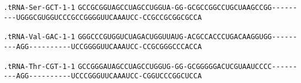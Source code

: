 \documentclass{article}
\newcommand{\rnabox}[1]{\colorbox{#1}{\texttt{#1}}}
\begin{document}
\texttt{.tRNA-Ser-GCT-1-1}
\rnabox{G}\rnabox{C}\rnabox{C}\rnabox{G}\rnabox{C}\rnabox{G}\rnabox{G}\rnabox{U}\rnabox{A}\rnabox{G}\rnabox{C}\rnabox{C}\rnabox{U}\rnabox{A}\rnabox{G}\rnabox{C}\rnabox{C}\rnabox{U}\rnabox{G}\rnabox{G}\rnabox{U}\rnabox{A}\rnabox{-}\rnabox{G}\rnabox{G}\rnabox{-}\rnabox{G}\rnabox{C}\rnabox{G}\rnabox{C}\rnabox{C}\rnabox{G}\rnabox{G}\rnabox{C}\rnabox{C}\rnabox{U}\rnabox{G}\rnabox{C}\rnabox{U}\rnabox{A}\rnabox{A}\rnabox{G}\rnabox{C}\rnabox{C}\rnabox{G}\rnabox{G}\rnabox{-}\rnabox{-}\rnabox{-}\rnabox{-}\rnabox{-}\rnabox{-}\rnabox{-}\rnabox{-}\rnabox{-}\rnabox{U}\rnabox{G}\rnabox{G}\rnabox{G}\rnabox{C}\rnabox{G}\rnabox{U}\rnabox{G}\rnabox{G}\rnabox{U}\rnabox{C}\rnabox{C}\rnabox{C}\rnabox{G}\rnabox{C}\rnabox{C}\rnabox{G}\rnabox{G}\rnabox{G}\rnabox{G}\rnabox{U}\rnabox{U}\rnabox{C}\rnabox{A}\rnabox{A}\rnabox{A}\rnabox{U}\rnabox{C}\rnabox{C}\rnabox{-}\rnabox{C}\rnabox{C}\rnabox{G}\rnabox{C}\rnabox{C}\rnabox{G}\rnabox{C}\rnabox{G}\rnabox{G}\rnabox{C}\rnabox{G}\rnabox{C}\rnabox{C}\rnabox{A}

\vspace{-0.5mm}

\texttt{.tRNA-Val-GAC-1-1}
\rnabox{G}\rnabox{G}\rnabox{G}\rnabox{C}\rnabox{C}\rnabox{C}\rnabox{G}\rnabox{U}\rnabox{G}\rnabox{G}\rnabox{U}\rnabox{C}\rnabox{U}\rnabox{A}\rnabox{G}\rnabox{A}\rnabox{C}\rnabox{U}\rnabox{G}\rnabox{G}\rnabox{U}\rnabox{U}\rnabox{A}\rnabox{U}\rnabox{G}\rnabox{-}\rnabox{A}\rnabox{C}\rnabox{G}\rnabox{C}\rnabox{C}\rnabox{A}\rnabox{C}\rnabox{C}\rnabox{C}\rnabox{U}\rnabox{G}\rnabox{A}\rnabox{C}\rnabox{A}\rnabox{A}\rnabox{G}\rnabox{G}\rnabox{U}\rnabox{G}\rnabox{G}\rnabox{-}\rnabox{-}\rnabox{-}\rnabox{-}\rnabox{-}\rnabox{-}\rnabox{-}\rnabox{-}\rnabox{-}\rnabox{A}\rnabox{G}\rnabox{G}\rnabox{-}\rnabox{-}\rnabox{-}\rnabox{-}\rnabox{-}\rnabox{-}\rnabox{-}\rnabox{-}\rnabox{-}\rnabox{-}\rnabox{U}\rnabox{C}\rnabox{C}\rnabox{G}\rnabox{G}\rnabox{G}\rnabox{G}\rnabox{U}\rnabox{U}\rnabox{C}\rnabox{A}\rnabox{A}\rnabox{A}\rnabox{U}\rnabox{C}\rnabox{C}\rnabox{-}\rnabox{C}\rnabox{C}\rnabox{G}\rnabox{C}\rnabox{G}\rnabox{G}\rnabox{G}\rnabox{C}\rnabox{C}\rnabox{C}\rnabox{A}\rnabox{C}\rnabox{C}\rnabox{A}

\vspace{-0.5mm}

\texttt{.tRNA-Thr-CGT-1-1}
\rnabox{G}\rnabox{C}\rnabox{C}\rnabox{G}\rnabox{G}\rnabox{G}\rnabox{A}\rnabox{U}\rnabox{A}\rnabox{G}\rnabox{C}\rnabox{C}\rnabox{U}\rnabox{A}\rnabox{G}\rnabox{C}\rnabox{C}\rnabox{U}\rnabox{G}\rnabox{G}\rnabox{U}\rnabox{G}\rnabox{-}\rnabox{G}\rnabox{G}\rnabox{-}\rnabox{G}\rnabox{C}\rnabox{G}\rnabox{G}\rnabox{G}\rnabox{G}\rnabox{G}\rnabox{A}\rnabox{C}\rnabox{U}\rnabox{C}\rnabox{G}\rnabox{U}\rnabox{A}\rnabox{A}\rnabox{U}\rnabox{C}\rnabox{C}\rnabox{C}\rnabox{C}\rnabox{-}\rnabox{-}\rnabox{-}\rnabox{-}\rnabox{-}\rnabox{-}\rnabox{-}\rnabox{-}\rnabox{-}\rnabox{A}\rnabox{G}\rnabox{G}\rnabox{-}\rnabox{-}\rnabox{-}\rnabox{-}\rnabox{-}\rnabox{-}\rnabox{-}\rnabox{-}\rnabox{-}\rnabox{-}\rnabox{U}\rnabox{C}\rnabox{C}\rnabox{C}\rnabox{G}\rnabox{G}\rnabox{G}\rnabox{U}\rnabox{U}\rnabox{C}\rnabox{A}\rnabox{A}\rnabox{A}\rnabox{U}\rnabox{C}\rnabox{C}\rnabox{-}\rnabox{C}\rnabox{G}\rnabox{G}\rnabox{U}\rnabox{C}\rnabox{C}\rnabox{C}\rnabox{G}\rnabox{G}\rnabox{C}\rnabox{U}\rnabox{C}\rnabox{C}\rnabox{A}
\end{document}
